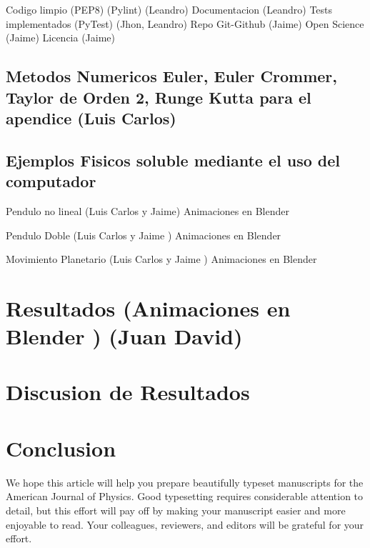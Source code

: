 \documentclass[12pt, letterpaper]{article}
\begin{document}
Codigo limpio (PEP8) (Pylint) (Leandro)
Documentacion (Leandro)
Tests implementados (PyTest) (Jhon, Leandro)
Repo Git-Github  (Jaime)
Open Science (Jaime)
Licencia (Jaime)

\subsection{Metodos Numericos Euler, Euler Crommer,  Taylor de Orden 2, Runge Kutta para el apendice (Luis Carlos)}
\subsection{Ejemplos Fisicos soluble mediante el uso del computador}

Pendulo no lineal (Luis Carlos y Jaime) Animaciones en Blender

Pendulo Doble (Luis Carlos y Jaime ) Animaciones en Blender

Movimiento Planetario (Luis Carlos y Jaime ) Animaciones en Blender


\section{Resultados (Animaciones en Blender ) (Juan David)}


\section{Discusion de Resultados}


\section{Conclusion}

We hope this article will help you prepare beautifully typeset
manuscripts for the American Journal of Physics.  Good typesetting requires
considerable attention to detail, but this effort will pay off by making your
manuscript easier and more enjoyable to read.  Your colleagues, reviewers, 
and editors will be grateful for your effort.
\end{document}
